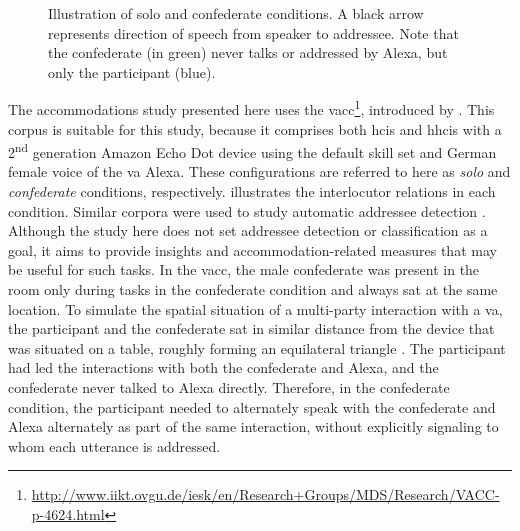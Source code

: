 \begin{figure}[t]
	\centering
	\hfill
	\caption[Solo and confederate conditions in \acs{hhci} setting]
		{Illustration of solo and confederate conditions.
		A black arrow represents direction of speech from speaker to addressee.
		Note that the confederate (in green) never talks or addressed by Alexa, but only the participant (blue).}
	\label{fig:conditions_comparison}
\end{figure}
%
The accommodations study presented here uses the \acf{vacc}\footnote{\url{http://www.iikt.ovgu.de/iesk/en/Research+Groups/MDS/Research/VACC-p-4624.html}}, introduced by \citet{Siegert2018VACC}.
This corpus is suitable for this study, because it comprises both \acp{hci} and \acp{hhci} with a 2\textsuperscript{nd} generation Amazon Echo Dot device using the default skill set and German female voice of the \acf{va} Alexa.
These configurations are referred to here as \emph{solo} and \emph{confederate} conditions, respectively.
 illustrates the interlocutor relations in each condition.
Similar corpora were used to study automatic addressee detection \citep[e.g.,][]{Shriberg2013addressee, vanTurnhout2005identifying}.
Although the study here does not set addressee detection or classification as a goal, it aims to provide insights and accommodation-related measures that may be useful for such tasks.
In the \ac{vacc}, the male confederate was present in the room only during tasks in the confederate condition and always sat at the same location.
To simulate the spatial situation of a multi-party interaction with a \ac{va}, the participant and the confederate sat in similar distance from the device that was situated on a table, roughly forming an equilateral triangle \citep[see Figure 2 in][]{Siegert2018VACC}.
The participant had led the interactions with both the confederate and Alexa, and the confederate never talked to Alexa directly.
Therefore, in the confederate condition, the participant needed to alternately speak with the confederate and Alexa alternately as part of the same interaction, without explicitly signaling to whom each utterance is addressed.
